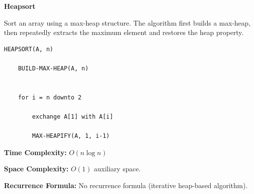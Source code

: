 \documentclass[a4paper,12pt]{article}
\begin{document}
\begin{tcolorbox}[
    colback=gray!30,
    colframe=black,
    boxrule=1pt,
    arc=0mm
]

\begin{tcolorbox}[
    colback=gray!10,
    colframe=black,
    arc=0mm
]
\centering
{\Huge\bfseries Heapsort}
\end{tcolorbox}


\begin{tcolorbox}[
    colback=gray!10,
    colframe=black,
    arc=0mm
]
\small
Sort an array using a max-heap structure.
The algorithm first builds a max-heap, then repeatedly extracts
the maximum element and restores the heap property.
\end{tcolorbox}


\begin{tcolorbox}[
    colback=black!5,
    colframe=black,
    arc=0mm,
    title=Pseudo-code
]
\tiny
\begin{lstlisting}
HEAPSORT(A, n)

    BUILD-MAX-HEAP(A, n)


    for i = n downto 2

        exchange A[1] with A[i]

        MAX-HEAPIFY(A, 1, i-1)
\end{lstlisting}
\end{tcolorbox}


\begin{tcolorbox}[
    colback=cyan!20,
    colframe=black,
    arc=0mm
]
\small
\textbf{Time Complexity:}
$O(n \log n)$
\end{tcolorbox}


\begin{tcolorbox}[
    colback=violet!20,
    colframe=black,
    arc=0mm
]
\small
\textbf{Space Complexity:}
$O(1)$ auxiliary space.
\end{tcolorbox}


\begin{tcolorbox}[
    colback=pink!20,
    colframe=black,
    arc=0mm
]
\small
\textbf{Recurrence Formula:}
No recurrence formula (iterative heap-based algorithm).
\end{tcolorbox}

\end{tcolorbox}
\end{document}
